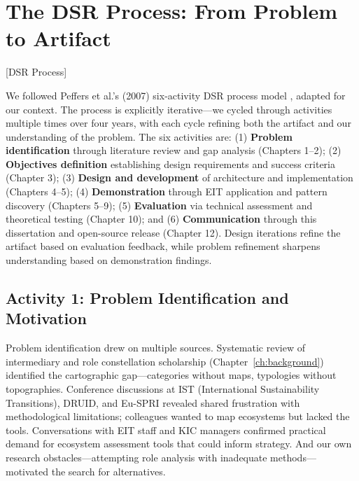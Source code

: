 \documentclass[../main.tex]{subfiles}
\begin{document}
\section{The DSR Process: From Problem to Artifact}[DSR Process]

We followed Peffers et al.'s (2007) six-activity DSR process model \cite{peffers2007dsr}, adapted for our context. The process is explicitly iterative---we cycled through activities multiple times over four years, with each cycle refining both the artifact and our understanding of the problem. The six activities are: (1) \textbf{Problem identification} through literature review and gap analysis (Chapters 1--2); (2) \textbf{Objectives definition} establishing design requirements and success criteria (Chapter 3); (3) \textbf{Design and development} of architecture and implementation (Chapters 4--5); (4) \textbf{Demonstration} through EIT application and pattern discovery (Chapters 5--9); (5) \textbf{Evaluation} via technical assessment and theoretical testing (Chapter 10); and (6) \textbf{Communication} through this dissertation and open-source release (Chapter 12). Design iterations refine the artifact based on evaluation feedback, while problem refinement sharpens understanding based on demonstration findings.

\subsection{Activity 1: Problem Identification and Motivation}

Problem identification drew on multiple sources. Systematic review of intermediary and role constellation scholarship (Chapter~\ref{ch:background}) identified the cartographic gap---categories without maps, typologies without topographies. Conference discussions at IST (International Sustainability Transitions), DRUID, and Eu-SPRI revealed shared frustration with methodological limitations; colleagues wanted to map ecosystems but lacked the tools. Conversations with EIT staff and KIC managers confirmed practical demand for ecosystem assessment tools that could inform strategy. And our own research obstacles---attempting role analysis with inadequate methods---motivated the search for alternatives.
\end{document}
